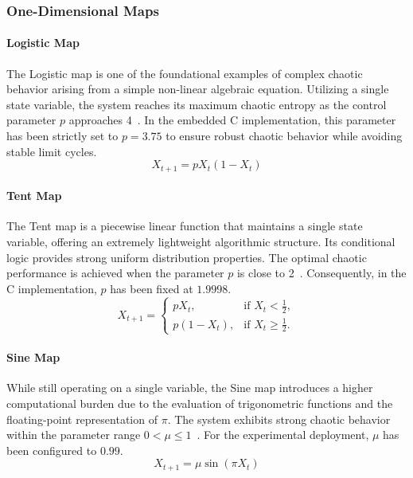 \documentclass[11pt,a4paper]{report}
\begin{document}
\subsubsection{One-Dimensional Maps}

\paragraph{Logistic Map}
The Logistic map is one of the foundational examples of complex chaotic behavior arising from a simple non-linear algebraic equation. 
Utilizing a single state variable, the system reaches its maximum chaotic entropy as the control parameter $p$ approaches 4~\cite{logisticTentDefaultParameters}. 
In the embedded C implementation, this parameter has been strictly set to $p = 3.75$ to ensure robust chaotic behavior while avoiding stable limit cycles.
\begin{equation}
    X_{t+1} = p X_t (1 - X_t)
    \label{eq:logistic_map}
\end{equation}

\paragraph{Tent Map}
The Tent map is a piecewise linear function that maintains a single state variable, offering an extremely lightweight algorithmic structure. 
Its conditional logic provides strong uniform distribution properties. 
The optimal chaotic performance is achieved when the parameter $p$ is close to 2~\cite{logisticTentDefaultParameters}. 
Consequently, in the C implementation, $p$ has been fixed at $1.9998$.
\begin{equation}
    X_{t+1} = 
    \begin{cases} 
        p X_t, & \text{if } X_t < \frac{1}{2}, \\[4pt]
        p (1 - X_t), & \text{if } X_t \ge \frac{1}{2}.
    \end{cases}
    \label{eq:tent_map}
\end{equation}

\paragraph{Sine Map}
While still operating on a single variable, the Sine map introduces a higher computational burden due to the evaluation of trigonometric functions and the floating-point representation of $\pi$. 
The system exhibits strong chaotic behavior within the parameter range $0 < \mu \le 1$~\cite[p. 8]{origineMappeCaotiche}. 
For the experimental deployment, $\mu$ has been configured to $0.99$.
\begin{equation}
    X_{t+1} = \mu \sin(\pi X_t)
    \label{eq:sine_map}
\end{equation}
\end{document}

